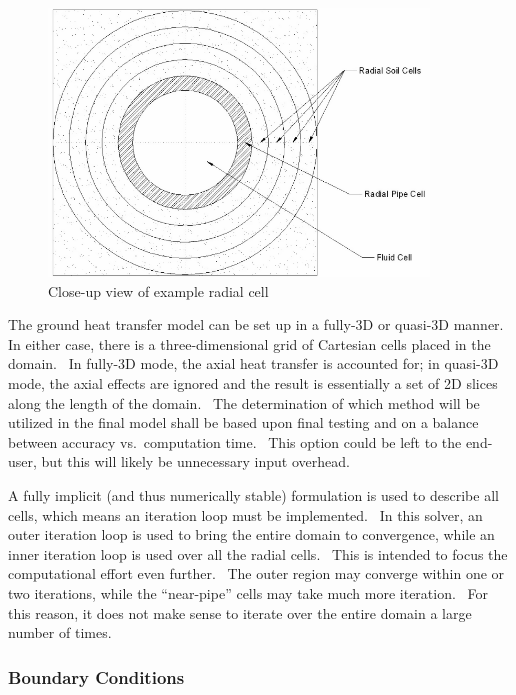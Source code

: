 \begin{figure}[hbtp] %
\centering
\includegraphics[width=0.9\textwidth, height=0.9\textheight, keepaspectratio=true]{media/image5853.png}
\caption{Close-up view of example radial cell \protect \label{fig:close-up-view-of-example-radial-cell}}
\end{figure}

The ground heat transfer model can be set up in a fully-3D or quasi-3D manner.~ In either case, there is a three-dimensional grid of Cartesian cells placed in the domain.~ In fully-3D mode, the axial heat transfer is accounted for; in quasi-3D mode, the axial effects are ignored and the result is essentially a set of 2D slices along the length of the domain.~ The determination of which method will be utilized in the final model shall be based upon final testing and on a balance between accuracy vs.~computation time.~ This option could be left to the end-user, but this will likely be unnecessary input overhead.

A fully implicit (and thus numerically stable) formulation is used to describe all cells, which means an iteration loop must be implemented.~ In this solver, an outer iteration loop is used to bring the entire domain to convergence, while an inner iteration loop is used over all the radial cells.~ This is intended to focus the computational effort even further.~ The outer region may converge within one or two iterations, while the ``near-pipe'' cells may take much more iteration.~ For this reason, it does not make sense to iterate over the entire domain a large number of times.

\subsubsection{Boundary Conditions}\label{boundary-conditions-1}


